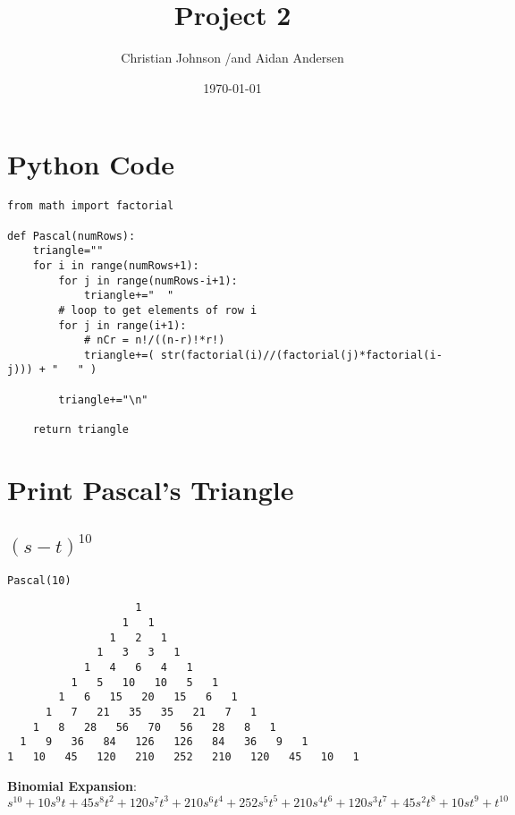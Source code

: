 \documentclass[11pt]{article}
\author{Christian Johnson /and Aidan Andersen}
\date{\today}
\title{Project 2}
\begin{document}
\maketitle
\tableofcontents

\newpage



\section{Python Code}
\label{sec:org25cd054}
\begin{verbatim}
from math import factorial

def Pascal(numRows):
    triangle=""
    for i in range(numRows+1):
        for j in range(numRows-i+1):
            triangle+="  "
        # loop to get elements of row i
        for j in range(i+1):
            # nCr = n!/((n-r)!*r!)
            triangle+=( str(factorial(i)//(factorial(j)*factorial(i-j))) + "   " )

        triangle+="\n"

    return triangle
\end{verbatim}

\section{Print Pascal's Triangle}
\label{sec:orgb60caa6}

\subsection{\((s-t)^{10}\)}
\label{sec:orgc6341a1}

\begin{verbatim}
Pascal(10)
\end{verbatim}

\begin{verbatim}
                    1   
                  1   1   
                1   2   1   
              1   3   3   1   
            1   4   6   4   1   
          1   5   10   10   5   1   
        1   6   15   20   15   6   1   
      1   7   21   35   35   21   7   1   
    1   8   28   56   70   56   28   8   1   
  1   9   36   84   126   126   84   36   9   1   
1   10   45   120   210   252   210   120   45   10   1   
\end{verbatim}

\textbf{Binomial Expansion}:
\(s^{10}+10s^{9}t+45s^{8}t^2+120s^7t^3+210s^6t^4+252s^5t^5+210s^4t^6+120s^3t^7+45s^2t^8+10st^9+t^{10}\)
\end{document}
